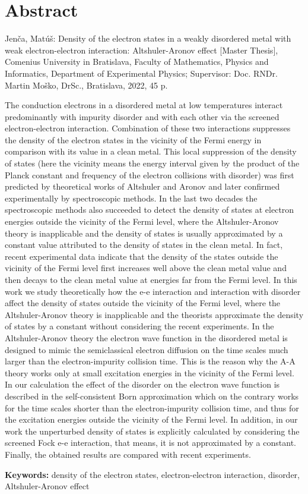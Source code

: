 
\thispagestyle{empty}
\section*{Abstract}

Jenča, Matúš: Density of the electron states in a weakly disordered metal with weak electron-electron interaction: Altshuler-Aronov effect [Master
Thesis], Comenius University in Bratislava, Faculty of Mathematics, Physics and Informatics, Department of Experimental Physics; Supervisor: Doc. RNDr. Martin Moško, DrSc., Bratislava, 2022, 45 p.

The conduction electrons in a disordered metal at low temperatures interact predominantly with impurity disorder and with each other via the screened electron-electron interaction. Combination of these 
two interactions suppresses the density of the electron states in the vicinity of the Fermi energy in comparison with its value in a clean metal.
This local suppression of the density of states (here the vicinity means the energy interval given by the product of the Planck constant and frequency of the electron collisions with disorder) was first predicted by theoretical works of Altshuler and Aronov and later confirmed experimentally by spectroscopic methods. In the last two decades the spectroscopic methods also succeeded to detect the density of states at electron energies outside the vicinity of the Fermi level, where the Altshuler-Aronov theory is inapplicable and the density of states is usually approximated by a constant value attributed to the density of states in the clean metal.
In fact, recent experimental data indicate that the density of the states outside the vicinity of the Fermi level first increases well above the clean metal value and then decays to the clean metal value at energies far from the Fermi level. In this work we study theoretically how the e-e interaction and interaction with disorder affect the density of states outside the vicinity of the Fermi level, where
the Altshuler-Aronov theory is inapplicable and the theorists approximate the density of states by a constant without considering the recent experiments.
In the Altshuler-Aronov theory the electron wave function in the disordered metal is designed to mimic the semiclassical electron diffusion on the time scales much larger than the electron-impurity collision time.
This is the reason why the A-A theory works only at small excitation energies in the vicinity of the Fermi level. In our calculation the effect of the disorder on the electron wave function is described in the
self-consistent Born approximation which on the contrary works for the time scales shorter than the electron-impurity collision time, and thus for the excitation energies outside the vicinity of the Fermi level.
In addition, in our work the unperturbed density of states is explicitly calculated by considering the screened Fock e-e interaction, that means, it is not approximated by a constant. Finally, the obtained results are compared
with recent experiments.

\begin{flushleft}
  \textbf{Keywords:} density of the electron states, electron-electron interaction, disorder, Altshuler-Aronov effect
\end{flushleft}

